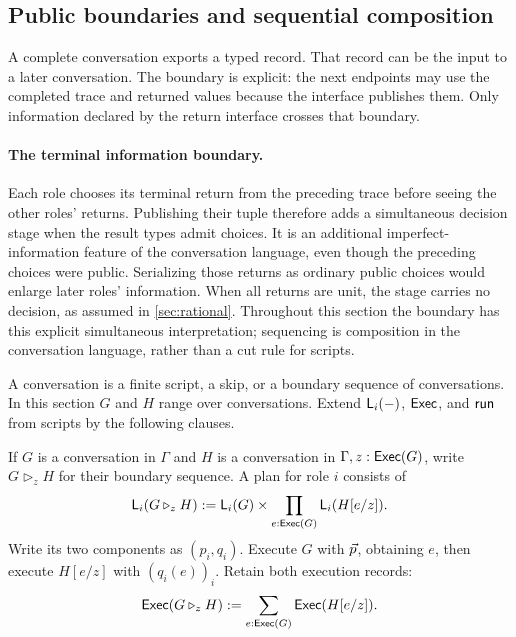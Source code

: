 \subsection{Public boundaries and sequential composition}
\label{sec:composition}

A complete conversation exports a typed record. That record can be the input
to a later conversation. The boundary is explicit: the next endpoints may use
the completed trace and returned values because the interface publishes them.
Only information declared by the return interface crosses that boundary.

\paragraph{The terminal information boundary.}
Each role chooses its terminal return from the preceding trace before seeing
the other roles' returns. Publishing their tuple therefore adds a simultaneous
decision stage when the result types admit choices. It is an additional
imperfect-information feature of the conversation language, even though the
preceding choices were public. Serializing those returns as ordinary public
choices would enlarge later roles' information. When all returns are unit,
the stage carries no decision, as assumed in \cref{sec:rational}.
Throughout this section the boundary has this
explicit simultaneous interpretation; sequencing is composition in the
conversation language, rather than a cut rule for scripts.

A conversation is a finite script, a skip, or a boundary sequence of
conversations. In this section $G$ and $H$ range over conversations. Extend
$\mathsf L_{i}(-)$, $\mathsf{Exec}$, and $\mathsf{run}$ from scripts by the following clauses.

\begin{definition}
If $G$ is a conversation in $\Gamma$ and
$H$ is a conversation in $\Gamma,z:\mathsf{Exec}(G)$, write $G\mathbin{\triangleright_z}H$
for their boundary sequence. A plan for role $i$ consists of
\begin{equation}
 \mathsf L_{i}(G\mathbin{\triangleright_z}H)
   :=\mathsf L_{i}(G)\times\prod_{e:\mathsf{Exec}(G)}\mathsf L_{i}(H[e/z]).
 \label{dep:eq:17}
\end{equation}
Write its two components as $(p_i,q_i)$.
Execute $G$ with $\vec p$, obtaining $e$, then execute $H[e/z]$ with
$(q_i(e))_i$. Retain both execution records:
\begin{equation}
 \mathsf{Exec}(G\mathbin{\triangleright_z}H)
       :=\sum_{e:\mathsf{Exec}(G)}\mathsf{Exec}(H[e/z]).
 \label{dep:eq:18}
\end{equation}
\end{definition}

